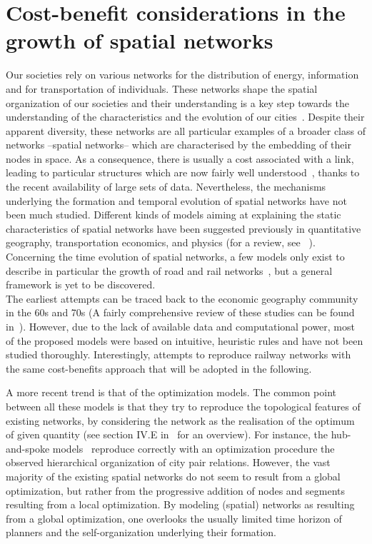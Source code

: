 \chapter{Cost-benefit considerations in the growth of spatial networks}
\label{chap:cost-benefit}


Our societies rely on various networks for the distribution of energy,
information and for transportation of individuals. These networks shape the
spatial organization of our societies and their understanding is a key step
towards the understanding of the characteristics and the evolution of our
cities~\cite{Batty:2013}. Despite their apparent diversity, these networks are
all particular examples of a broader class of networks --spatial networks--
which are characterised by the embedding of their nodes in space. As a
consequence, there is usually a cost associated with a link, leading to
particular structures which are now fairly well
understood~\cite{Barthelemy:2011}, thanks to the recent availability of large
sets of data. Nevertheless, the mechanisms underlying the formation and temporal
evolution of spatial networks have not been much studied. Different kinds of
models aiming at explaining the static characteristics of spatial networks have
been suggested previously in quantitative geography, transportation economics,
and physics (for a review, see ~\cite{Xie:2009}). Concerning the time
evolution of spatial networks, a few models only exist to describe in particular
the growth of road and rail networks~\cite{Levinson:2006, Gastner:2006,
Barthelemy:2008, Courtat:2011}, but a general framework is yet to be
discovered.\\


The earliest attempts can be traced back to the economic geography community in
the 60s and 70s (A fairly comprehensive review of these studies can be found
in~\cite{Haggett:1969}). However, due to the lack of available data and
computational power, most of the proposed models were based on intuitive,
heuristic rules and have not been studied thoroughly. Interestingly,
\cite{Black:1971} attempts to reproduce railway networks with the same
cost-benefits approach that will be adopted in the following.

A more recent trend is that of the optimization models. The common point between
all these models is that they try to reproduce the topological features of
existing networks, by considering the network as the realisation of the optimum
of given quantity (see section IV.E in~\cite{Barthelemy:2011} for an overview).
For instance, the hub-and-spoke models~\cite{OKelly:1998} reproduce correctly
with an optimization procedure the observed hierarchical organization of city
pair relations. However, the vast majority of the existing spatial networks do
not seem to result from a global optimization, but rather from the progressive
addition of nodes and segments resulting from a local optimization. By modeling
(spatial) networks as resulting from a global optimization, one overlooks the
usually limited time horizon of planners and the self-organization underlying
their formation.


